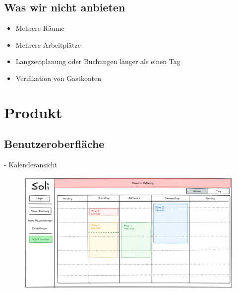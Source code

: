 \documentclass{sdqbeamer}
\begin{document}
\subsection{Was wir nicht anbieten}
\begin{frame}{\insertsubsectionhead}
    \begin{itemize}
        \item Mehrere Räume
        \item Mehrere Arbeitplätze
        \item Langzeitplanung oder Buchungen länger als einen Tag
        \item Verifikation von Gastkonten
    \end{itemize}
\end{frame}

\section{Produkt}

\subsection{Benutzeroberfläche}

\begin{frame}{{\insertsubsectionhead} - Kalenderansicht}
    \begin{figure}
        \centering
        \includegraphics[width=0.75\linewidth]{Benutzeroberfläche/BenutzeroberflächeKalender.png}
        \label{fig:enter-label}
    \end{figure}
\end{frame}
\end{document}
